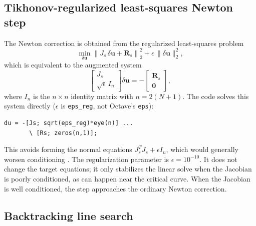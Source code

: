 \documentclass[11pt,a4paper]{article}
\begin{document}
\subsection{Tikhonov-regularized least-squares Newton step}

The Newton correction is obtained from the regularized least-squares
problem \cite{tikhonov1963}
\begin{equation}
\min_{\delta\mathbf u}
\left\|
J_s\,\delta\mathbf u+\mathbf R_s
\right\|_2^2
+
\epsilon\,\|\delta\mathbf u\|_2^2,
\label{eq:tikhonov}
\end{equation}
which is equivalent to the augmented system
\begin{equation}
\begin{bmatrix}
J_s\\
\sqrt{\epsilon}\,I_n
\end{bmatrix}
\delta\mathbf u
=
-
\begin{bmatrix}
\mathbf R_s\\
\mathbf 0
\end{bmatrix},
\label{eq:augmented}
\end{equation}
where $I_n$ is the $n\times n$ identity matrix with $n=2(N+1)$. The code
solves this system directly ($\epsilon$ is \texttt{eps\_reg}, not
Octave's \texttt{eps}):
\begin{lstlisting}[style=matlab]
du = -[Js; sqrt(eps_reg)*eye(n)] ...
       \ [Rs; zeros(n,1)];
\end{lstlisting}
This avoids forming the normal equations
$J_s^{T}J_s+\epsilon I_n$, which would generally worsen conditioning
\cite{golub2013}. The regularization parameter is $\epsilon=10^{-10}$. It
does not change the target equations; it only stabilizes the linear solve
when the Jacobian is poorly conditioned, as can happen near the critical
curve. When the Jacobian is well conditioned, the step approaches the
ordinary Newton correction.

\subsection{Backtracking line search}
\end{document}
